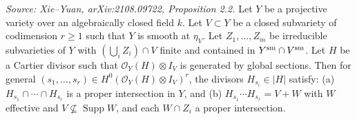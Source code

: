 \begin{proposition}
  \label{pro:bertini}
  \uses{}
  \textit{Source: Xie--Yuan, arXiv:2108.09722, Proposition 2.2.}
  Let \(Y\) be a projective variety over an algebraically closed field \(k\).
  Let \(V \subset Y\) be a closed subvariety of codimension \(r \geq 1\) such that \(Y\) is
  smooth at \(\eta_V\).
  Let \(Z_1,\dots,Z_m\) be irreducible subvarieties of \(Y\) with
  \((\bigcup_i Z_i) \cap V\) finite and contained in \(Y^{\rm sm} \cap V^{\rm sm}\).
  Let \(H\) be a Cartier divisor such that \(\mathcal{O}_Y(H) \otimes I_V\) is generated by
  global sections.
  Then for general \((s_1,\dots,s_r) \in H^0(\mathcal{O}_Y(H) \otimes I_V)^r\), the divisors
  \(H_{s_i} \in |H|\) satisfy: (a) \(H_{s_1} \cap \cdots \cap H_{s_r}\) is a proper
  intersection in \(Y\), and (b) \(H_{s_1} \cdots H_{s_r} = V + W\) with \(W\) effective
  and \(V \not\subseteq \operatorname{Supp}W\), and each \(W \cap Z_i\) a proper intersection.
\end{proposition}

